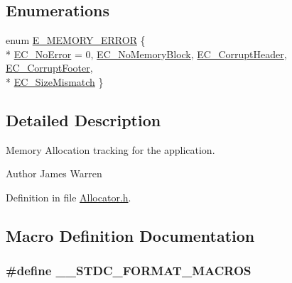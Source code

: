 \subsection*{Enumerations}
\begin{DoxyCompactItemize}
\item 
enum \hyperlink{_allocator_8h_adc7040deea27628dba424c534b71dbbf}{E\-\_\-\-M\-E\-M\-O\-R\-Y\-\_\-\-E\-R\-R\-O\-R} \{ \\*
\hyperlink{_allocator_8h_adc7040deea27628dba424c534b71dbbfa0bb40faa20ee2383cd4071a19e6756ee}{E\-C\-\_\-\-No\-Error} = 0, 
\hyperlink{_allocator_8h_adc7040deea27628dba424c534b71dbbfaaacd8ad060ec70bc74896b8f3375bfff}{E\-C\-\_\-\-No\-Memory\-Block}, 
\hyperlink{_allocator_8h_adc7040deea27628dba424c534b71dbbfabb546aef3131ea5f3da84fd374da1f45}{E\-C\-\_\-\-Corrupt\-Header}, 
\hyperlink{_allocator_8h_adc7040deea27628dba424c534b71dbbfac73a2ab817ee9057c110c277e1580317}{E\-C\-\_\-\-Corrupt\-Footer}, 
\\*
\hyperlink{_allocator_8h_adc7040deea27628dba424c534b71dbbfad493ed6f6910767ac848c9ebcc55c518}{E\-C\-\_\-\-Size\-Mismatch}
 \}
\end{DoxyCompactItemize}


\subsection{Detailed Description}
Memory Allocation tracking for the application. \begin{DoxyAuthor}{Author}
James Warren 
\end{DoxyAuthor}


Definition in file \hyperlink{_allocator_8h_source}{Allocator.\-h}.



\subsection{Macro Definition Documentation}
\subsubsection[{\-\_\-\-\_\-\-S\-T\-D\-C\-\_\-\-F\-O\-R\-M\-A\-T\-\_\-\-M\-A\-C\-R\-O\-S}]{\setlength{\rightskip}{0pt plus 5cm}\#define \-\_\-\-\_\-\-S\-T\-D\-C\-\_\-\-F\-O\-R\-M\-A\-T\-\_\-\-M\-A\-C\-R\-O\-S}\label{_allocator_8h_aacbb9e1f38be71e22df1584a37c56693}


